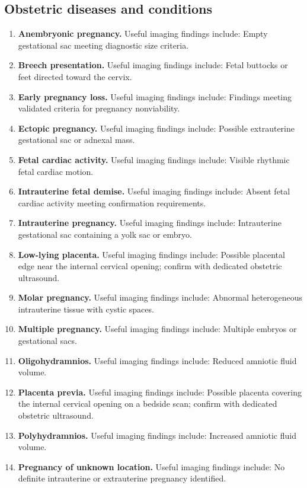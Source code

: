\subsection{Obstetric diseases and conditions}
\begin{enumerate}[leftmargin=*,itemsep=0.45em,topsep=0.4em]
\item \textbf{Anembryonic pregnancy.} Useful imaging findings include: Empty gestational sac meeting diagnostic size criteria.
\item \textbf{Breech presentation.} Useful imaging findings include: Fetal buttocks or feet directed toward the cervix.
\item \textbf{Early pregnancy loss.} Useful imaging findings include: Findings meeting validated criteria for pregnancy nonviability.
\item \textbf{Ectopic pregnancy.} Useful imaging findings include: Possible extrauterine gestational sac or adnexal mass.
\item \textbf{Fetal cardiac activity.} Useful imaging findings include: Visible rhythmic fetal cardiac motion.
\item \textbf{Intrauterine fetal demise.} Useful imaging findings include: Absent fetal cardiac activity meeting confirmation requirements.
\item \textbf{Intrauterine pregnancy.} Useful imaging findings include: Intrauterine gestational sac containing a yolk sac or embryo.
\item \textbf{Low-lying placenta.} Useful imaging findings include: Possible placental edge near the internal cervical opening; confirm with dedicated obstetric ultrasound.
\item \textbf{Molar pregnancy.} Useful imaging findings include: Abnormal heterogeneous intrauterine tissue with cystic spaces.
\item \textbf{Multiple pregnancy.} Useful imaging findings include: Multiple embryos or gestational sacs.
\item \textbf{Oligohydramnios.} Useful imaging findings include: Reduced amniotic fluid volume.
\item \textbf{Placenta previa.} Useful imaging findings include: Possible placenta covering the internal cervical opening on a bedside scan; confirm with dedicated obstetric ultrasound.
\item \textbf{Polyhydramnios.} Useful imaging findings include: Increased amniotic fluid volume.
\item \textbf{Pregnancy of unknown location.} Useful imaging findings include: No definite intrauterine or extrauterine pregnancy identified.

\end{enumerate}
